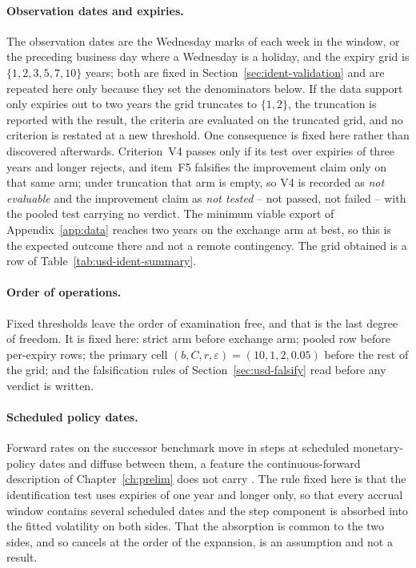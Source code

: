 \documentclass[../../../main.tex]{subfiles}
\begin{document}
\paragraph{Observation dates and expiries.} The observation dates are the Wednesday marks of each week in the window, or the preceding business day where a Wednesday is a holiday, and the expiry grid is $\{1,2,3,5,7,10\}$ years; both are fixed in Section~\ref{sec:ident-validation} and are repeated here only because they set the denominators below. If the data support only expiries out to two years the grid truncates to $\{1,2\}$, the truncation is reported with the result, the criteria are evaluated on the truncated grid, and no criterion is restated at a new threshold. One consequence is fixed here rather than discovered afterwards. Criterion~V4 passes only if its test over expiries of three years and longer rejects, and item~F5 falsifies the improvement claim only on that same arm; under truncation that arm is empty, so V4 is recorded as \emph{not evaluable} and the improvement claim as \emph{not tested} -- not passed, not failed -- with the pooled test carrying no verdict. The minimum viable export of Appendix~\ref{app:data} reaches two years on the exchange arm at best, so this is the expected outcome there and not a remote contingency. The grid obtained is a row of Table~\ref{tab:usd-ident-summary}.

\paragraph{Order of operations.} Fixed thresholds leave the order of examination free, and that is the last degree of freedom. It is fixed here: strict arm before exchange arm; pooled row before per-expiry rows; the primary cell $(b,C,r,\varepsilon)=(10,1,2,0.05)$ before the rest of the grid; and the falsification rules of Section~\ref{sec:usd-falsify} read before any verdict is written.

\paragraph{Scheduled policy dates.} Forward rates on the successor benchmark move in steps at scheduled monetary-policy dates and diffuse between them, a feature the continuous-forward description of Chapter~\ref{ch:prelim} does not carry \citep{brace2024}. The rule fixed here is that the identification test uses expiries of one year and longer only, so that every accrual window contains several scheduled dates and the step component is absorbed into the fitted volatility on both sides. That the absorption is common to the two sides, and so cancels at the order of the expansion, is an assumption and not a result.
\end{document}

